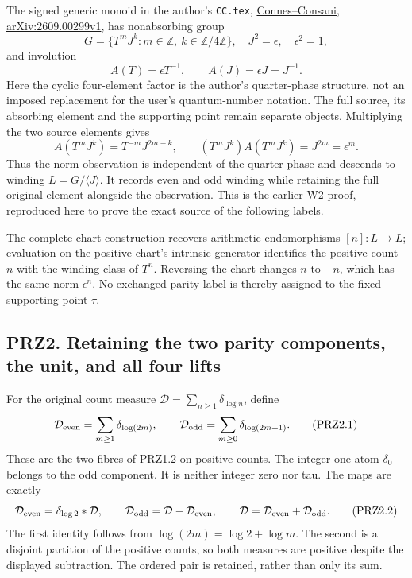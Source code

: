 \documentclass[
]{article}
\begin{document}
The signed generic monoid in the author's \texttt{CC.tex},
\href{https://arxiv.org/abs/2609.00299v1}{Connes--Consani,
arXiv:2609.00299v1}, has nonabsorbing group \[
G=\{T^mJ^k:m\in\mathbb Z,\ k\in\mathbb Z/4\mathbb Z\},
\quad J^2=\epsilon,\quad\epsilon^2=1,
\] and involution \[
A(T)=\epsilon T^{-1},\qquad A(J)=\epsilon J=J^{-1}.
\tag{PRZ1.1}
\] Here the cyclic four-element factor is the author's quarter-phase
structure, not an imposed replacement for the user's quantum-number
notation. The full source, its absorbing element and the supporting
point remain separate objects. Multiplying the two source elements gives
\[
A(T^mJ^k)=T^{-m}J^{2m-k},\qquad
(T^mJ^k)A(T^mJ^k)=J^{2m}=\epsilon^m.
\tag{PRZ1.2}
\] Thus the norm observation is independent of the quarter phase and
descends to winding \(L=G/\langle J\rangle\). It records even and odd
winding while retaining the full original element alongside the
observation. This is the earlier
\href{https://github.com/KokunoYumeto/zeta-function-research-reader/blob/6bc7202eceb05d1a482d495ad302803a80b5aeca/workbenches/splitzero-tandem/temporary-arguments/20260924-fixed-generic-point-purity/prime-clocks-p14/WINDING_PARITY_AND_INTEGER_SPECTRUM.md\#L55-L85}{W2
proof}, reproduced here to prove the exact source of the following
labels.

The complete chart construction recovers arithmetic endomorphisms
\([n]:L\to L\); evaluation on the positive chart's intrinsic generator
identifies the positive count \(n\) with the winding class of \(T^n\).
Reversing the chart changes \(n\) to \(-n\), which has the same norm
\(\epsilon^n\). No exchanged parity label is thereby assigned to the
fixed supporting point \(\tau\).

\subsection{PRZ2. Retaining the two parity components, the unit, and all
four
lifts}\label{prz2.-retaining-the-two-parity-components-the-unit-and-all-four-lifts}

For the original count measure
\(\mathcal D=\sum_{n\ge1}\delta_{\log n}\), define \[
\mathcal D_{\rm even}=\sum_{m\ge1}\delta_{\log(2m)},\qquad
\mathcal D_{\rm odd}=\sum_{m\ge0}\delta_{\log(2m+1)}.
\tag{PRZ2.1}
\] These are the two fibres of PRZ1.2 on positive counts. The
integer-one atom \(\delta_0\) belongs to the odd component. It is
neither integer zero nor tau. The maps are exactly \[
\mathcal D_{\rm even}=\delta_{\log2}*\mathcal D,
\qquad\mathcal D_{\rm odd}=\mathcal D-\mathcal D_{\rm even},
\qquad\mathcal D=\mathcal D_{\rm even}+\mathcal D_{\rm odd}.
\tag{PRZ2.2}
\] The first identity follows from \(\log(2m)=\log2+\log m\). The second
is a disjoint partition of the positive counts, so both measures are
positive despite the displayed subtraction. The ordered pair is
retained, rather than only its sum.
\end{document}
